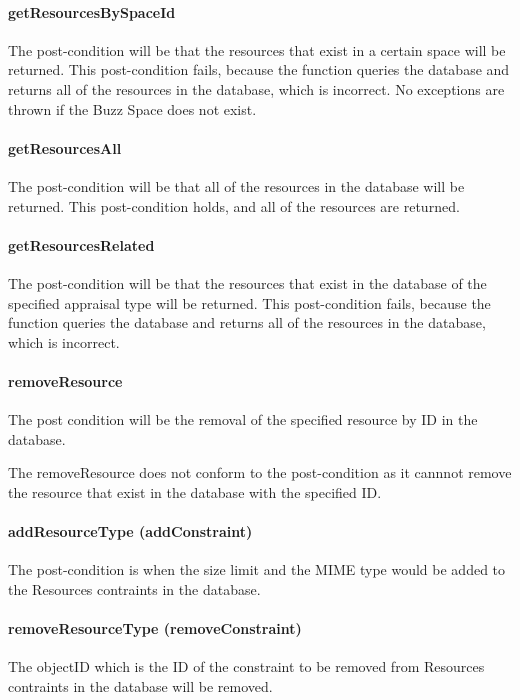 \documentclass[a4paper]{article}
\begin{document}
\paragraph{getResourcesBySpaceId}
The post-condition will be that the resources that exist in a certain space will be returned. This post-condition fails, because the function queries the database and returns all of the resources in the database, which is incorrect. No exceptions are thrown if the Buzz Space does not exist.

\paragraph{getResourcesAll}
The post-condition will be that all of the resources in the database will be returned. This post-condition holds, and all of the resources are returned.

\paragraph{getResourcesRelated}
The post-condition will be that the resources that exist in the database of the specified appraisal type will be returned. This post-condition fails, because the function queries the database and returns all of the resources in the database, which is incorrect.

\paragraph{removeResource}
The post condition will be the removal of the specified resource by ID in the database.

The removeResource does not conform to the post-condition as it cannnot remove the resource that exist in the database with the specified ID.

\paragraph{addResourceType (addConstraint)}
The post-condition is when the size limit and the MIME type would be added to the Resources contraints in the database.

\paragraph{removeResourceType (removeConstraint)}
The objectID which is the ID of the constraint to be removed from Resources contraints in the database will be removed.
\end{document}
